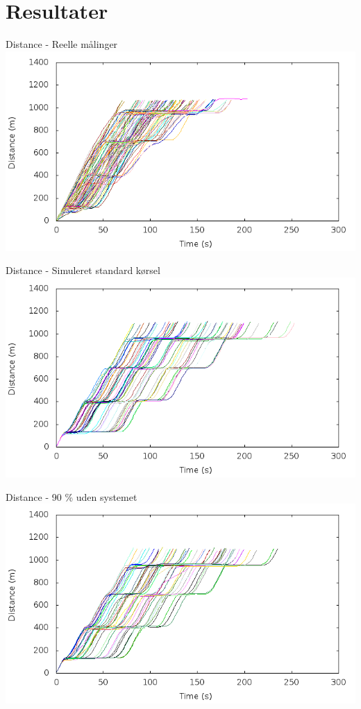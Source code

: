 \section{Resultater}

\begin{frame}{Distance - Reelle målinger}
\includegraphics[width=1\textwidth]{images/RealDistance.png}
\end{frame}

\begin{frame}{Distance - Simuleret standard kørsel}
\includegraphics[width=1\textwidth]{images/distanceUncontrolled0.png}
\end{frame}

\begin{frame}{Distance - 90 \% uden systemet}
\includegraphics[width=1\textwidth]{images/distanceUncontrolled10.png}
\end{frame}


